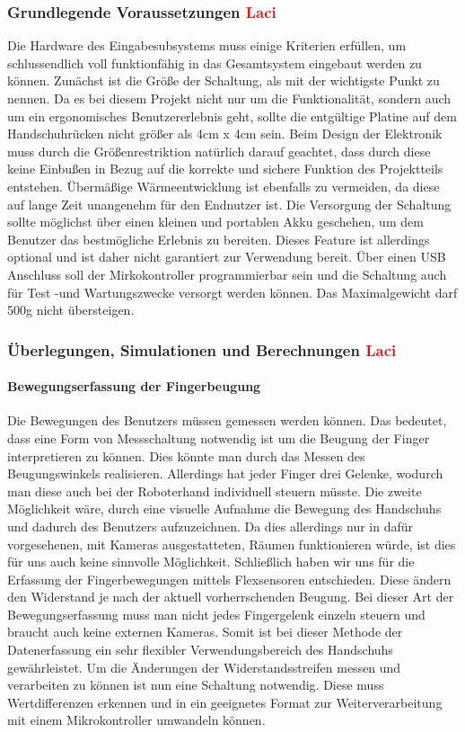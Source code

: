 \documentclass[titlepage,12pt,twoside]{article}
\begin{document}
\subsubsection{Grundlegende Voraussetzungen \textcolor{red}{Laci}}
Die Hardware des Eingabesubsystems muss einige Kriterien erfüllen, um schlussendlich voll funktionfähig in das Gesamtsystem eingebaut 
werden zu können. Zunächst ist die Größe der Schaltung, als mit der wichtigste Punkt zu nennen. Da es bei diesem Projekt nicht nur
um die Funktionalität, sondern auch um ein ergonomisches Benutzererlebnis geht, sollte die entgültige Platine auf dem Handschuhrücken
nicht größer als 4cm x 4cm sein. Beim Design der Elektronik muss durch die Größenrestriktion natürlich darauf geachtet, dass durch
diese keine Einbußen in Bezug auf die korrekte und sichere Funktion des Projektteils entstehen. Übermäßige Wärmeentwicklung ist 
ebenfalls zu vermeiden, da diese auf lange Zeit unangenehm für den Endnutzer ist. Die Versorgung der Schaltung
sollte möglichst über einen kleinen und portablen Akku geschehen, um dem Benutzer das bestmögliche Erlebnis zu bereiten. Dieses Feature ist
allerdings optional und ist daher nicht garantiert zur Verwendung bereit. Über einen USB Anschluss soll der Mirkokontroller programmierbar sein und die Schaltung
auch für Test -und Wartungszwecke versorgt werden können. Das Maximalgewicht darf 500g nicht übersteigen. \\

\subsubsection{Überlegungen, Simulationen und Berechnungen \textcolor{red}{Laci}}
\paragraph{Bewegungserfassung der Fingerbeugung}
\hfill \break
\hfill \break
Die Bewegungen des Benutzers müssen gemessen werden können. Das bedeutet, dass eine Form von Messschaltung notwendig ist um die  
Beugung der Finger interpretieren zu können. Dies könnte man durch das Messen des Beugungswinkels realisieren. Allerdings hat 
jeder Finger drei Gelenke, wodurch man diese auch bei der Roboterhand individuell steuern müsste. Die zweite Möglichkeit wäre, 
durch eine visuelle Aufnahme die Bewegung des Handschuhs und dadurch des Benutzers aufzuzeichnen. Da dies allerdings nur in dafür vorgesehenen, 
mit Kameras ausgestatteten, Räumen funktionieren würde, ist dies für uns auch keine sinnvolle Möglichkeit. Schließlich haben 
wir uns für die Erfassung der Fingerbewegungen mittels Flexsensoren entschieden. Diese ändern den Widerstand je nach der 
aktuell vorherrschenden Beugung. Bei dieser Art der Bewegungserfassung muss man nicht jedes Fingergelenk einzeln steuern und 
braucht auch keine externen Kameras. Somit ist bei dieser Methode der Datenerfassung ein sehr flexibler Verwendungsbereich 
des Handschuhs gewährleistet. Um die Änderungen der Widerstandsstreifen messen und verarbeiten zu können ist nun eine Schaltung 
notwendig. Diese muss Wertdifferenzen erkennen und in ein geeignetes Format zur Weiterverarbeitung mit einem Mikrokontroller
umwandeln können.
\\
\\
\end{document}
